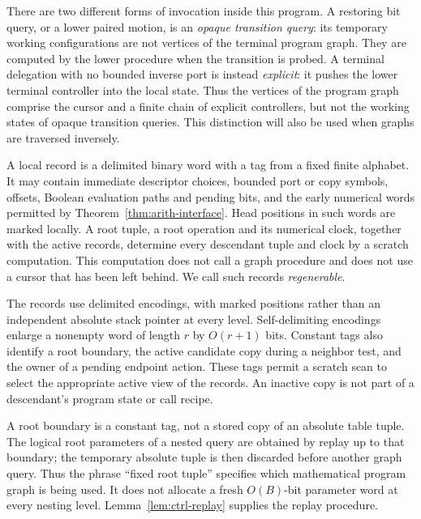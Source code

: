 There are two different forms of invocation inside this program.  A
restoring bit query, or a lower paired motion, is an \emph{opaque
transition query}: its temporary working configurations are not vertices
of the terminal program graph.  They are computed by the lower
procedure when the transition is probed.  A terminal delegation with no
bounded inverse port is instead \emph{explicit}: it pushes the lower
terminal controller into the local state.  Thus the vertices of the
program graph comprise the cursor and a finite chain of explicit
controllers, but not the working states of opaque transition queries.
This distinction will also be used when graphs are traversed inversely.

\begin{definition}\label{def:ctrl-record}
A local record is a delimited binary word with a tag from a fixed finite
alphabet.  It may contain immediate descriptor choices, bounded port or
copy symbols, offsets, Boolean evaluation paths and pending bits, and the
early numerical words permitted by Theorem~\ref{thm:arith-interface}.
Head positions in such words are marked locally.  A root tuple, a root
operation and its numerical clock, together with the active records,
determine every descendant tuple and clock by a scratch computation.
This computation does not call a graph procedure and does not use a
cursor that has been left behind.  We call such records
\emph{regenerable}.
\end{definition}

The records use delimited encodings, with marked positions rather than
an independent absolute stack pointer at every level.  Self-delimiting
encodings enlarge a nonempty word of length $r$ by $O(r+1)$ bits.
Constant tags also identify a root boundary, the active candidate copy
during a neighbor test, and the owner of a pending endpoint action.
These tags permit a scratch scan to select the appropriate active view
of the records.  An inactive copy is not part of a descendant's program
state or call recipe.

A root boundary is a constant tag, not a stored copy of an absolute
table tuple.  The logical root parameters of a nested query are obtained
by replay up to that boundary; the temporary absolute tuple is then
discarded before another graph query.  Thus the phrase ``fixed root
tuple'' specifies which mathematical program graph is being used.  It
does not allocate a fresh $O(B)$-bit parameter word at every nesting
level.  Lemma~\ref{lem:ctrl-replay} supplies the replay procedure.

